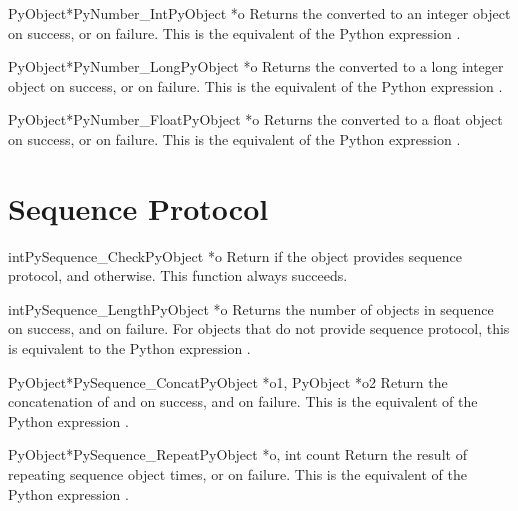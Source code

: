 \documentclass{manual}
\begin{document}
\begin{cfuncdesc}{PyObject*}{PyNumber_Int}{PyObject *o}
Returns the  converted to an integer object on success, or
\NULL{} on failure.  This is the equivalent of the Python
expression .
\end{cfuncdesc}

\begin{cfuncdesc}{PyObject*}{PyNumber_Long}{PyObject *o}
Returns the  converted to a long integer object on success,
or \NULL{} on failure.  This is the equivalent of the Python
expression .
\end{cfuncdesc}

\begin{cfuncdesc}{PyObject*}{PyNumber_Float}{PyObject *o}
Returns the  converted to a float object on success, or
\NULL{} on failure.  This is the equivalent of the Python expression
.
\end{cfuncdesc}


\section{Sequence Protocol \label{sequence}}

\begin{cfuncdesc}{int}{PySequence_Check}{PyObject *o}
Return  if the object provides sequence protocol, and
 otherwise.  This function always succeeds.
\end{cfuncdesc}

\begin{cfuncdesc}{int}{PySequence_Length}{PyObject *o}
Returns the number of objects in sequence  on success, and
 on failure.  For objects that do not provide sequence
protocol, this is equivalent to the Python expression
.
\end{cfuncdesc}

\begin{cfuncdesc}{PyObject*}{PySequence_Concat}{PyObject *o1, PyObject *o2}
Return the concatenation of  and  on success, and \NULL{} on
failure.   This is the equivalent of the Python
expression .
\end{cfuncdesc}


\begin{cfuncdesc}{PyObject*}{PySequence_Repeat}{PyObject *o, int count}
Return the result of repeating sequence object
  times, or \NULL{} on failure.  This is the
equivalent of the Python expression .
\end{cfuncdesc}
\end{document}
